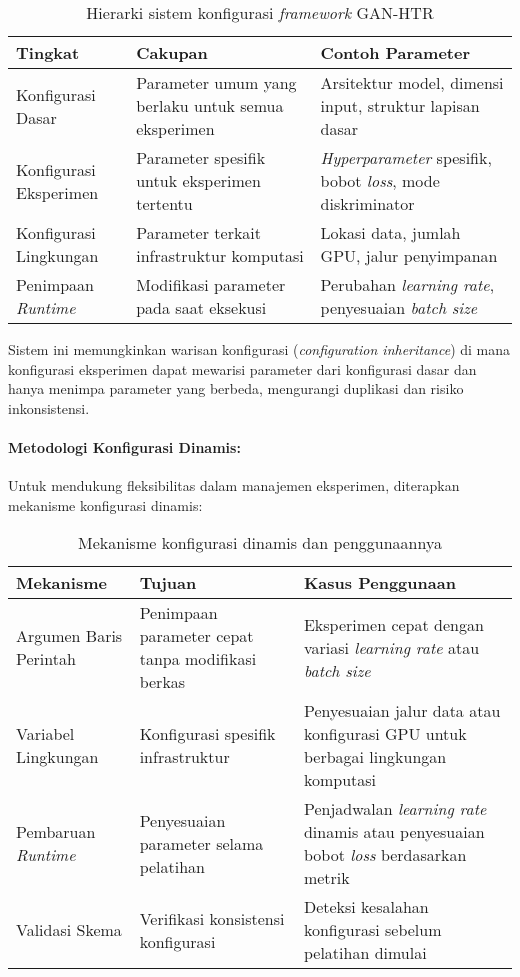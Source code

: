 \documentclass[12pt,a4paper]{article}
\begin{document}
\begin{table}[H]
\centering
\caption{Hierarki sistem konfigurasi \textit{framework} GAN-HTR}
\label{tab:config-hierarchy}
\small
\begin{tabular}{|l|p{5cm}|p{6cm}|}
\hline
\textbf{Tingkat} & \textbf{Cakupan} & \textbf{Contoh Parameter} \\ \hline
Konfigurasi Dasar & Parameter umum yang berlaku untuk semua eksperimen & Arsitektur model, dimensi input, struktur lapisan dasar \\ \hline
Konfigurasi Eksperimen & Parameter spesifik untuk eksperimen tertentu & \textit{Hyperparameter} spesifik, bobot \textit{loss}, mode diskriminator \\ \hline
Konfigurasi Lingkungan & Parameter terkait infrastruktur komputasi & Lokasi data, jumlah GPU, jalur penyimpanan \\ \hline
Penimpaan \textit{Runtime} & Modifikasi parameter pada saat eksekusi & Perubahan \textit{learning rate}, penyesuaian \textit{batch size} \\ \hline
\end{tabular}
\end{table}

Sistem ini memungkinkan warisan konfigurasi (\textit{configuration inheritance}) di mana konfigurasi eksperimen dapat mewarisi parameter dari konfigurasi dasar dan hanya menimpa parameter yang berbeda, mengurangi duplikasi dan risiko inkonsistensi.

\paragraph{Metodologi Konfigurasi Dinamis:}
Untuk mendukung fleksibilitas dalam manajemen eksperimen, diterapkan mekanisme konfigurasi dinamis:

\begin{table}[H]
\centering
\caption{Mekanisme konfigurasi dinamis dan penggunaannya}
\label{tab:dynamic-config}
\small
\begin{tabular}{|p{4cm}|p{5cm}|p{5cm}|}
\hline
\textbf{Mekanisme} & \textbf{Tujuan} & \textbf{Kasus Penggunaan} \\ \hline
Argumen Baris Perintah & Penimpaan parameter cepat tanpa modifikasi berkas & Eksperimen cepat dengan variasi \textit{learning rate} atau \textit{batch size} \\ \hline
Variabel Lingkungan & Konfigurasi spesifik infrastruktur & Penyesuaian jalur data atau konfigurasi GPU untuk berbagai lingkungan komputasi \\ \hline
Pembaruan \textit{Runtime} & Penyesuaian parameter selama pelatihan & Penjadwalan \textit{learning rate} dinamis atau penyesuaian bobot \textit{loss} berdasarkan metrik \\ \hline
Validasi Skema & Verifikasi konsistensi konfigurasi & Deteksi kesalahan konfigurasi sebelum pelatihan dimulai \\ \hline
\end{tabular}
\end{table}
\end{document}
